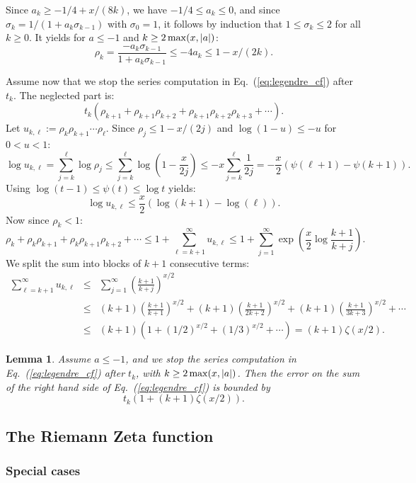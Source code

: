 \documentclass[12pt]{amsart}
\newtheorem{lemma}{Lemma}
\begin{document}
Since $a_k \geq -1/4 + x/(8k)$, we have $-1/4 \leq a_k \leq 0$, and
since $\sigma_k = 1/(1 + a_k \sigma_{k-1})$ with $\sigma_0 = 1$,
it follows by induction that $1 \leq \sigma_k \leq 2$ for all $k \geq 0$.
It yields for $a \leq -1$ and $k \geq 2 \, {\rm max}(x,|a|)$:
\[ \rho_k = \frac{-a_k \sigma_{k-1}}{1 + a_k \sigma_{k-1}} 
   \leq -4 a_k \leq 1 - x/(2k). \]

Assume now that we stop the series computation in Eq.~(\ref{eq:legendre_cf})
after $t_k$. The neglected part is:
\[ t_k (\rho_{k+1} + \rho_{k+1} \rho_{k+2} + \rho_{k+1} \rho_{k+2} \rho_{k+3}
   + \cdots). \]
Let $u_{k,\ell} := \rho_{k} \rho_{k+1} \cdots \rho_{\ell}$.
Since $\rho_j \leq 1 - x/(2j)$ and $\log(1-u) \leq -u$ for $0 < u < 1$:
\[ \log u_{k,\ell} = \sum_{j=k}^{\ell} \log \rho_j
   \leq \sum_{j=k}^{\ell} \log (1-\frac{x}{2j})
   \leq -x \sum_{j=k}^{\ell} \frac{1}{2j}
   = -\frac{x}{2} (\psi(\ell+1) - \psi(k+1)). \]
Using $\log(t-1) \leq \psi(t) \leq \log t$ yields:
\[ \log u_{k,\ell} \leq \frac{x}{2} (\log(k+1) - \log(\ell)). \]
Now since $\rho_k < 1$:
\[ \rho_k + \rho_k \rho_{k+1} + \rho_k \rho_{k+1} \rho_{k+2} + \cdots
   \leq 1 + \sum_{\ell=k+1}^{\infty} u_{k,\ell}
   \leq 1 + \sum_{j=1}^{\infty} \exp(\frac{x}{2} \log\frac{k+1}{k+j}). \]
We split the sum into blocks of $k+1$ consecutive terms:
\begin{eqnarray*}
\sum_{\ell=k+1}^{\infty} u_{k,\ell}
   &\leq& \sum_{j=1}^{\infty} \left( \frac{k+1}{k+j} \right)^{x/2} \\
   &\leq& (k+1) \left( \frac{k+1}{k+1} \right)^{x/2}
   + (k+1) \left( \frac{k+1}{2k+2} \right)^{x/2}
   + (k+1) \left( \frac{k+1}{3k+3} \right)^{x/2} + \cdots \\
   &\leq& (k+1) (1 + (1/2)^{x/2} + (1/3)^{x/2} + \cdots) = (k+1) \zeta(x/2).
\end{eqnarray*}

\begin{lemma}
Assume $a \leq -1$,
and we stop the series computation in Eq.~(\ref{eq:legendre_cf})
after $t_k$, with $k \geq 2 \, {\rm max}(x,|a|)$.
Then the error on the sum of the right hand side
of Eq.~(\ref{eq:legendre_cf}) is bounded by
\[ t_k (1 + (k+1) \zeta(x/2)). \]
\end{lemma}

\subsection{The Riemann Zeta function}

\subsubsection{Special cases}
\end{document}
